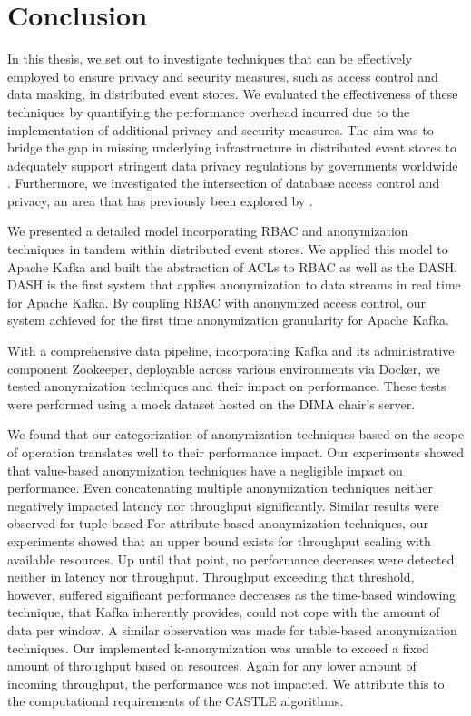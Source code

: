 \chapter{Conclusion\label{cha:chapter7}}
In this thesis, we set out to investigate techniques that can be effectively employed to ensure privacy and security measures, such as access control and data masking, in distributed event stores. We evaluated the effectiveness of these techniques by quantifying the performance overhead incurred due to the implementation of additional privacy and security measures. The aim was to bridge the gap in missing underlying infrastructure in distributed event stores to adequately support stringent data privacy regulations by governments worldwide \cite{Colombo2015}. Furthermore, we investigated the intersection of database access control and privacy, an area that has previously been explored by \cite{chaudhuri2011database}. \par
We presented a detailed model incorporating \ac{RBAC} and anonymization techniques in tandem within distributed event stores. We applied this model to Apache Kafka and built the abstraction of \acp{ACL} to \ac{RBAC} as well as the \acf{DASH}. \ac{DASH} is the first system that applies anonymization to data streams in real time for Apache Kafka. By coupling \ac{RBAC} with anonymized access control, our system achieved for the first time anonymization granularity for Apache Kafka. \par
With a comprehensive data pipeline, incorporating Kafka and its administrative component Zookeeper, deployable across various environments via Docker, we tested anonymization techniques and their impact on performance. These tests were performed using a mock dataset hosted on the \ac{DIMA} chair's server. \par
We found that our categorization of anonymization techniques based on the scope of operation translates well to their performance impact. Our experiments showed that value-based anonymization techniques have a negligible impact on performance. Even concatenating multiple anonymization techniques neither negatively impacted latency nor throughput significantly. Similar results were observed for tuple-based 
For attribute-based anonymization techniques, our experiments showed that an upper bound exists for throughput scaling with available resources. Up until that point, no performance decreases were detected, neither in latency nor throughput. Throughput exceeding that threshold, however, suffered significant performance decreases as the time-based windowing technique, that Kafka inherently provides, could not cope with the amount of data per window. A similar observation was made for table-based anonymization techniques. Our implemented k-anonymization was unable to exceed a fixed amount of throughput based on resources. Again for any lower amount of incoming throughput, the performance was not impacted. We attribute this to the computational requirements of the CASTLE algorithms. \par
